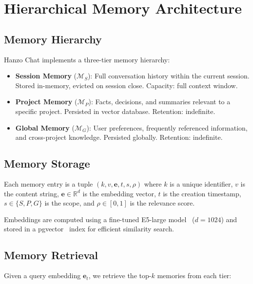 \section{Hierarchical Memory Architecture}

\label{sec:memory}

\subsection{Memory Hierarchy}

Hanzo Chat implements a three-tier memory hierarchy:

\begin{definition}
\begin{itemize}[leftmargin=1.1em]
    \item \textbf{Session Memory} ($\mathcal{M}_S$): Full conversation history within the current session. Stored in-memory, evicted on session close. Capacity: full context window.
    \item \textbf{Project Memory} ($\mathcal{M}_P$): Facts, decisions, and summaries relevant to a specific project. Persisted in vector database. Retention: indefinite.
    \item \textbf{Global Memory} ($\mathcal{M}_G$): User preferences, frequently referenced information, and cross-project knowledge. Persisted globally. Retention: indefinite.
\end{itemize}
\end{definition}

\subsection{Memory Storage}

Each memory entry is a tuple $(k, v, \bm{e}, t, s, \rho)$ where $k$ is a unique identifier, $v$ is the content string, $\bm{e} \in \mathbb{R}^d$ is the embedding vector, $t$ is the creation timestamp, $s \in \{S, P, G\}$ is the scope, and $\rho \in [0, 1]$ is the relevance score.

Embeddings are computed using a fine-tuned E5-large model~\cite{wang2022text} ($d = 1024$) and stored in a pgvector~\cite{pgvector2023} index for efficient similarity search.

\subsection{Memory Retrieval}

Given a query embedding $\bm{e}_t$, we retrieve the top-$k$ memories from each tier:

